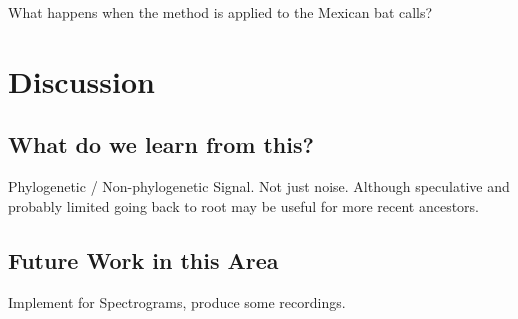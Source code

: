 \documentclass[wsdraft]{ws-rv9x6} %
\begin{document}
What happens when the method is applied to the Mexican bat calls?

\section{Discussion}

\subsection{What do we learn from this?}

Phylogenetic / Non-phylogenetic Signal. Not just noise. Although speculative and probably limited going back to root may be useful for more recent ancestors.

\subsection{Future Work in this Area}

Implement for Spectrograms, produce some recordings.





\end{document}

